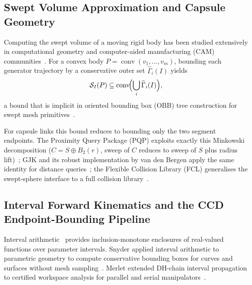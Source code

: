 \documentclass[journal]{IEEEtran}
\begin{document}
\subsection{Swept Volume Approximation and Capsule Geometry}

Computing the swept volume of a moving rigid body has been studied extensively
in computational geometry and computer-aided manufacturing (CAM)
communities~\cite{blackmore1992swept,abdel2006swept}.
For a convex body $P = \operatorname{conv}(v_1,\dots,v_m)$, bounding each
generator trajectory by a conservative outer set $\widehat{\Gamma}_i(I)$ yields
\[
  \mathcal{S}_I(P) \subseteq \operatorname{conv}\!\Bigl(\bigcup_i \widehat{\Gamma}_i(I)\Bigr),
\]
a bound that is implicit in oriented bounding box (OBB) tree construction for
swept mesh primitives~\cite{gottschalk1996obbtree}.

For capsule links this bound reduces to bounding only the two segment endpoints.
The Proximity Query Package (PQP) exploits exactly this Minkowski decomposition
($C = S \oplus B_2(r)$, sweep of $C$ reduces to sweep of $S$ plus radius
lift)~\cite{larsen1999fast}; GJK and its robust implementation by van den
Bergen apply the same identity for distance queries~\cite{gilbert1988fast,
bergen1999gjk}; the Flexible Collision Library (FCL) generalises the swept-sphere interface to
a full collision library~\cite{pan2012fcl}.

\subsection{Interval Forward Kinematics and the CCD Endpoint-Bounding Pipeline}

Interval arithmetic~\cite{moore2009introduction,jaulin2001applied} provides
inclusion-monotone enclosures of real-valued functions over parameter intervals.
Snyder applied interval arithmetic to parametric geometry to compute
conservative bounding boxes for curves and surfaces without mesh
sampling~\cite{snyder1992interval}. Merlet extended DH-chain interval
propagation to certified workspace analysis for parallel and serial
manipulators~\cite{merlet2004solving,merlet2009interval}.
\end{document}

